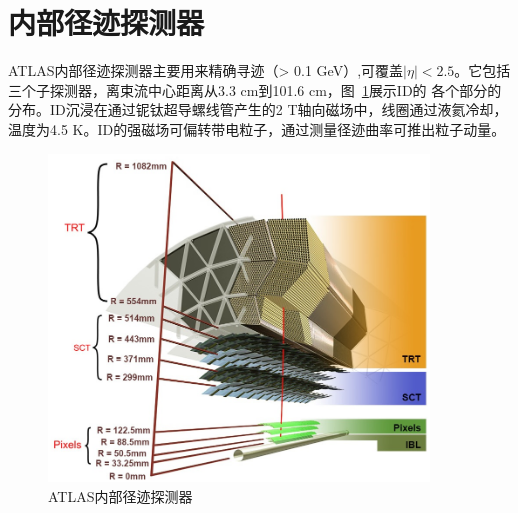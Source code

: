 \section{内部径迹探测器}
ATLAS内部径迹探测器主要用来精确寻迹（\pt > 0.1 GeV）,可覆盖$|\eta|<2.5$。它包括三个子探测器，离束流中心距离从3.3 cm到101.6 cm，图~\ref{fig:ATLAS_ID_sideview}展示ID的
各个部分的分布。ID沉浸在通过铌钛超导螺线管产生的2 T轴向磁场中，线圈通过液氦冷却，温度为4.5 K。ID的强磁场可偏转带电粒子，通过测量径迹曲率可推出粒子动量。
\begin{figure}[h]
\begin{center}
\includegraphics[width=0.9\textwidth]{fig/ATLAS_ID_sideview.png}
\caption{ATLAS内部径迹探测器} \label{fig:ATLAS_ID_sideview}
\end{center}
\end{figure}


